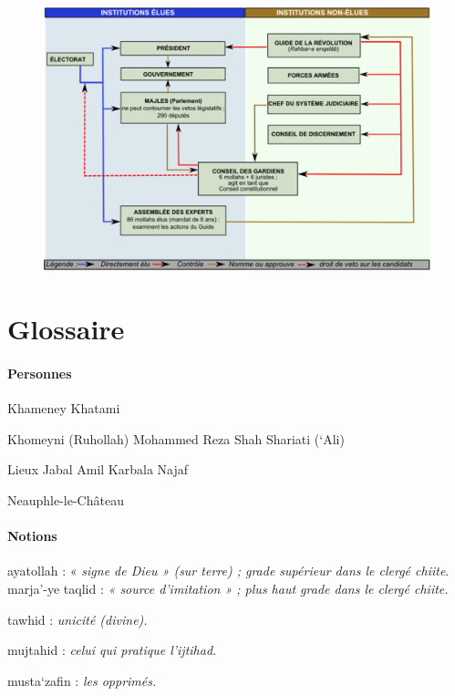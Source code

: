 \begin{figure}[h!]
    \centering
    \includegraphics[width=\textwidth]{CourantsIslamContemporain/ImagesCourantsIslamContemporain/image3.jpeg}
  
    \label{fig:my_label}
\end{figure}
 

 





\hypertarget{glossaire-6}{%
\section{ {Glossaire}}\label{glossaire-6}}

 
\paragraph{Personnes}



Khameney Khatami

Khomeyni (Ruhollah) Mohammed Reza Shah Shariati (`Ali)

{Lieux} Jabal Amil Karbala Najaf

Neauphle-le-Château

\paragraph{Notions}

ayatollah : « \emph{signe de Dieu » (sur terre) ; grade supérieur dans
le clergé chiite}. marja'-ye taqlid : \emph{« source d'imitation » ;
plus haut grade dans le clergé chiite.} 



tawhid : \emph{unicité (divine).}

mujtahid : \emph{celui qui pratique l'ijtihad.}

musta`zafin : \emph{les opprimés.}


